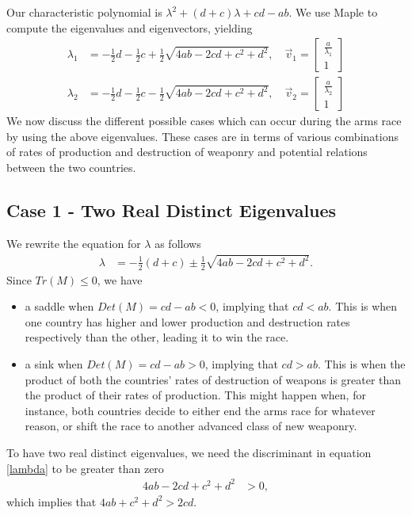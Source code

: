 Our characteristic polynomial is $\lambda^2 + (d+c)\lambda + cd - ab$. We use Maple to compute the eigenvalues and eigenvectors, yielding
	\begin{align}
	\lambda_1 & = -\frac{1}{2}d - \frac{1}{2}c + \frac{1}{2}\sqrt{4ab -2cd + c^2 + d^2}, \quad \vec{v}_1 = 
	\begin{bmatrix}
	\frac{a}{\lambda_1}\\
	1
	\end{bmatrix} 
	\end{align} 
	\begin{align} 
	\lambda_2 & = -\frac{1}{2}d - \frac{1}{2}c - \frac{1}{2}\sqrt{4ab -2cd + c^2 + d^2}, \quad \vec{v}_2 = 
	\begin{bmatrix}
	\frac{a}{\lambda_2}\\
	1
	\end{bmatrix}
	\end{align}	
We now discuss the different possible cases which can occur during the arms race by using the above eigenvalues. 
These cases are in terms of various combinations of rates of production and destruction of weaponry and potential relations between the two countries.


\subsection{Case 1 - Two Real Distinct Eigenvalues}

We rewrite the equation for $\lambda$ as follows
	\begin{align} \label{lambda}
	\lambda & = -\frac{1}{2}(d + c) \pm \frac{1}{2}\sqrt{4ab -2cd + c^2 + d^2}.
	\end{align}
Since $Tr(M) \le 0$, we have 
	\begin{itemize}
	\item a saddle when $Det(M) = cd-ab < 0$, implying that $cd<ab$. This is when one country has higher and lower production and destruction rates respectively than the other, leading it to win the race.
	
	\item a sink when $Det(M) = cd-ab > 0$, implying that $cd>ab$. This is when the product of both the countries' rates of destruction of weapons is greater than the product of their rates of production. 
	This might happen when, for instance, both countries decide to either end the arms race for whatever reason, or shift the race to another advanced class of new weaponry.
	
	\end{itemize}
To have two real distinct eigenvalues, we need the discriminant in equation \eqref{lambda} to be greater than zero
	\begin{align} \label{discGreaterThanZero}
	4ab -2cd + c^2 + d^2 & > 0,
	\end{align}
which implies that $4ab + c^2 + d^2 > 2cd$. 

